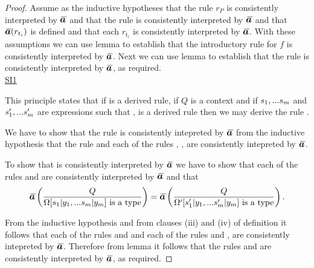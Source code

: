 \begin{proof}
Assume as the inductive hypotheses  that the rule $r_P$ is consistently interpreted by $\Ibar$ and that 
the rule  is consistently interpreted by $\Ibar$
and that $\Ibar(r_{t_i})$ is defined \foreachi and that each $r_{t_i}$ is consistently
interpreted by $\Ibar$.
With these assumptions we can use lemma  to establish that the introductory rule for $f$ is consistently interpreted by $\Ibar$.
Next we can use lemma 
to establish that the rule  is consistently interpreted by $\Ibar$, as required. \\
%
\newpage
\underline{SI1} 
\newcommand{\SIonesourcelhs}{\gatdisplayrule{\yOmega{m}}{\isT{\Omega}}}
\newcommand{\SIonesourcerhs}{\gatdisplayrule{\yOmega{m}}{\isT{\Omega'}}}
\newcommand{\SIoneconclusion}{\gatdisplayrule{Q}{\Omega[\SUBsFORy{m}]=\Omega'[\SUBspFORy{m}]}}
\newcommand{\SIoneconclusionlhs}{\ZOmegaSUBsmFORym}
\newcommand{\SIoneconclusionrhs}{\gatdisplayrule{Q}{\isT{\Omega'[\SUBspFORy{m}]}}}

This principle states that if  is a derived rule, if $Q$ is a context and if  $s_1,...s_{m}$ and $s'_1,...s'_{m}$ are expressions such that \foreachj,  is a derived rule then we may derive the rule \SIoneconclusion. 

We have to show that the rule \SIoneconclusion is consistently intepreted by $\Ibar$
from the inductive hypothesis  that the rule 
and each of the rules , \wherej, are consistently intepreted by $\Ibar$.

To show that \SIoneconclusion is consistently interpreted by $\Ibar$
we have to show that each of the rules \SIoneconclusionlhs and \SIoneconclusionrhs
are consistently interpreted by $\Ibar$ and that
\begin{equation}
\label{SI1inductivetarget2}
\ibarmappedrule{Q}{\isT{\Omega[\SUBsFORy{m}]}} = \ibarmappedrule{Q}{\isT{\Omega'[\SUBspFORy{m}]}}.
\end{equation}

From the  inductive hypothesis  and from clauses (iii) and (iv) of definition  it follows that
each of the rules
\SIonesourcelhs
and
\SIonesourcerhs
and each of the rules
and
\wherej, are consistently intepreted by $\Ibar$. 
Therefore from lemma  it follows that
 the rules \SIoneconclusionlhs and \SIoneconclusionrhs
are consistently interpreted by $\Ibar$, as required.


\end{proof}
